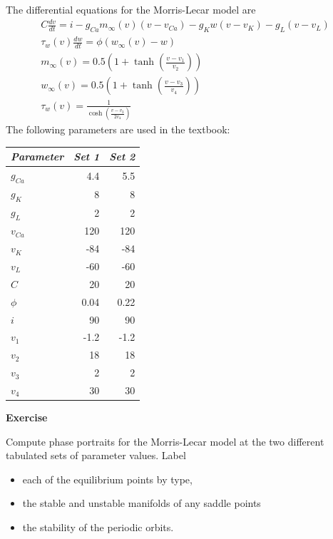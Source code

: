 \documentclass [11pt]{article}
\newcounter{exercise}
\numberwithin{exercise}{section}
\newcommand{\exnumber}{\addtocounter{exercise}{1} \theexercise \thinspace}
\begin{document}
The differential equations for the Morris-Lecar model are 
\begin{equation}
\begin{gathered}
C\frac{dv}{dt} = i - g_{Ca} m_\infty(v)(v-v_{Ca}) - g_K w(v-v_K) - g_L (v-v_L) \\
\tau_w(v) \frac{dw}{dt} = \phi (w_\infty(v) - w) \\
m_\infty(v) = 0.5(1+ \tanh(\frac{v-v_1}{v_2})) \\
w_\infty(v) = 0.5(1+ \tanh(\frac{v-v_3}{v_4})) \\
\tau_w(v) = \frac{1}{\cosh(\frac{v-v_3}{2v_4})}
\end{gathered} 
\end{equation}
The following parameters are used in the textbook:
\begin{table}
\label{ml_table}
\begin{center}
\begin{tabular}{||l|r|r||}
\hline
{\it Parameter} & {\it Set 1} & {\it Set 2} \\
\hline \hline
$g_{Ca}$ & 4.4 & 5.5\\ \hline
$g_K$ & 8 & 8 \\ \hline
$g_L$ & 2 & 2 \\ \hline
$v_{Ca}$ & 120 & 120 \\ \hline
$v_K$ & -84 & -84 \\ \hline
$v_L$ & -60 & -60 \\ \hline
$C$ & 20 & 20 \\ \hline
$\phi$ & 0.04 & 0.22 \\ \hline
$i$ & 90 & 90 \\ \hline
$v_1$ & -1.2 & -1.2 \\ \hline
$v_2$ & 18 &  18 \\ \hline
$v_3$ & 2 & 2 \\ \hline
$v_4$ & 30 & 30 \\ \hline
\end{tabular}
\end{center}
\end{table}

{\bf Exercise \exnumber} Compute phase portraits for the Morris-Lecar model at the two different
tabulated sets of parameter values. Label\begin{itemize} 
\item each of the equilibrium points by type, 
\item the stable and unstable manifolds of any saddle points 
\item the stability of the periodic orbits. 
\end{itemize}
\end{document}
